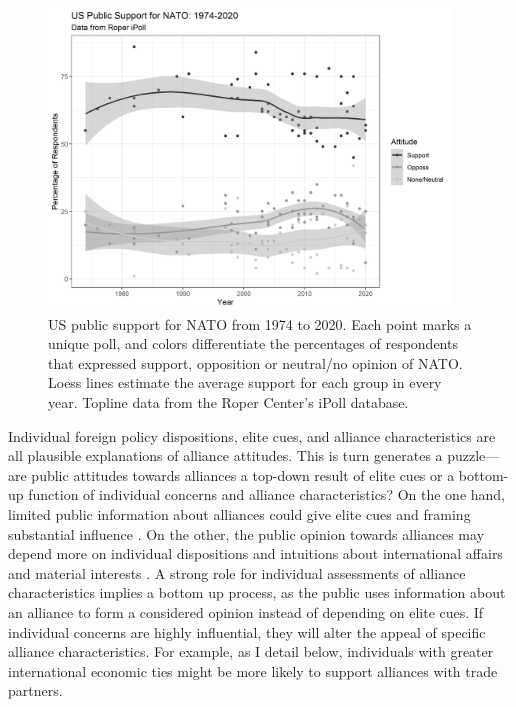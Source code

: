 \documentclass[12pt]{article}
\begin{document}
\begin{figure}
	\centering
		\includegraphics[width=0.95\textwidth]{../figures/nato-op-time.png}
	\caption{US public support for NATO from 1974 to 2020. Each point marks a unique poll, and colors differentiate the percentages of respondents that expressed support, opposition or neutral/no opinion of NATO. Loess lines estimate the average support for each group in every year. Topline data from the Roper Center's iPoll database.}
	\label{fig:nato-op-time}
\end{figure}


Individual foreign policy dispositions, elite cues, and alliance characteristics are all plausible explanations of alliance attitudes.
This is turn generates a puzzle--- are public attitudes towards alliances a top-down result of elite cues or a bottom-up function of individual concerns and alliance characteristics? 
On the one hand, limited public information about alliances could give elite cues and framing substantial influence \citep{Druckman2001}. 
On the other, the public opinion towards alliances may depend more on individual dispositions and intuitions about international affairs \citep{KertzerZeitzoff2017} and material interests \citep{RhoTomz2017}.
A strong role for individual assessments of alliance characteristics implies a bottom up process, as the public uses information about an alliance to form a considered opinion instead of depending on elite cues.
If individual concerns are highly influential, they will alter the appeal of specific alliance characteristics. 
For example, as I detail below, individuals with greater international economic ties might be more likely to support alliances with trade partners.  
\end{document}
